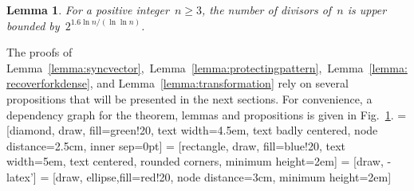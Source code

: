 \documentclass[10pt,a4paper,onecolumn]{IEEEtran}
\newtheorem{lemma}{Lemma}
\newcommand{\1}{\mathbbold{1}}
\begin{document}
\begin{lemma}\label{lemma:numberofdivisors}
For a positive integer~$n\ge 3$, the number of divisors of~$n$ is upper bounded by~$2^{1.6\ln n/(\ln \ln n)}$.
\end{lemma}
The proofs of Lemma~\ref{lemma:syncvector},~Lemma~\ref{lemma:protectingpattern},~Lemma~\ref{lemma:recoverforkdense}, and Lemma~\ref{lemma:transformation} rely on several propositions that will be presented in the next sections. For convenience, a dependency graph for the theorem, lemmas and propositions is given in Fig.~\ref{figure:dependencies}.  
 = [diamond, draw, fill=green!20, text width=4.5em, text badly centered, node distance=2.5cm, inner sep=0pt]
 = [rectangle, draw, fill=blue!20, text width=5em, text centered, rounded corners, minimum height=2em]
 = [draw, -latex']
 = [draw, ellipse,fill=red!20, node distance=3cm, minimum height=2em]
\begin{figure}[omitted: a diagram of this paper's results, not reproduced here]\label{figure:dependencies}\end{figure}
\end{document}
